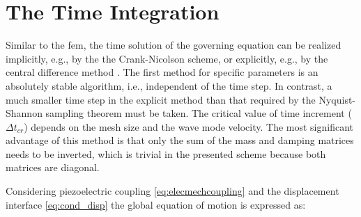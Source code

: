 \section{The Time Integration}
\label{sec:time}

Similar to the \ac{fem}, the time solution of the governing equation can be realized implicitly, e.g., by the the Crank-Nicolson
scheme, or explicitly, e.g., by the central difference method \cite{bathe2006finite}.
The first method for specific parameters is an absolutely stable algorithm, i.e., independent of the time step.
In contrast, a much smaller time step in the explicit method than that required by the Nyquist-Shannon sampling theorem must be taken.
The critical value of time increment (\(\Delta t_{cr}\)) depends on the mesh size and the wave mode velocity.
The most significant advantage of this method is that only the sum of the mass and damping matrices needs to be inverted, which is trivial in the presented scheme because both matrices are diagonal.

Considering piezoelectric coupling \ref{eq:elecmechcoupling} and the displacement interface \ref{eq:cond_disp} the global equation of motion is expressed as:

